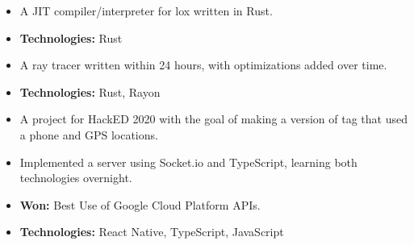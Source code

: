 \documentclass[10pt,a4paper,ragged2e,withhyper]{altacv}
\begin{document}
\begin{paracol}{2}
  \begin{itemize}
    \item A JIT compiler/interpreter for lox written in Rust.
    \item \textbf{Technologies:} Rust
  \end{itemize}
  \divider\small

  \switchcolumn{}

  \begin{itemize}
    \item A ray tracer written within 24 hours, with optimizations added over time.
    \item \textbf{Technologies:} Rust, Rayon
  \end{itemize}
  \divider\small


  \begin{itemize}
    \item A project for HackED 2020 with the goal of making a version of tag that used a phone and GPS locations.
    \item Implemented a server using Socket.io and TypeScript, learning both technologies overnight.
    \item \textbf{Won:} Best Use of Google Cloud Platform APIs.
    \item \textbf{Technologies:} React Native, TypeScript, JavaScript
  \end{itemize}
  \divider\small




\end{paracol}
\end{document}
